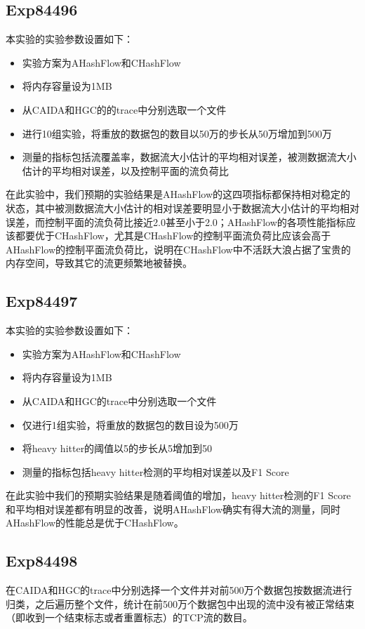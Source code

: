 \documentclass{article}
\begin{document}
\subsection{Exp84496}
本实验的实验参数设置如下：
\begin{itemize}
\item 实验方案为AHashFlow和CHashFlow
\item 将内存容量设为1MB
\item 从CAIDA和HGC的的trace中分别选取一个文件
\item 进行10组实验，将重放的数据包的数目以50万的步长从50万增加到500万
\item 测量的指标包括流覆盖率，数据流大小估计的平均相对误差，被测数据流大小估计的平均相对误差，以及控制平面的流负荷比
\end{itemize}

在此实验中，我们预期的实验结果是AHashFlow的这四项指标都保持相对稳定的状态，其中被测数据流大小估计的相对误差要明显小于数据流大小估计的平均相对误差，而控制平面的流负荷比接近2.0甚至小于2.0；AHashFlow的各项性能指标应该都要优于CHashFlow，尤其是CHashFlow的控制平面流负荷比应该会高于AHashFlow的控制平面流负荷比，说明在CHashFlow中不活跃大浪占据了宝贵的内存空间，导致其它的流更频繁地被替换。

\subsection{Exp84497}
本实验的实验参数设置如下：
\begin{itemize}
\item 实验方案为AHashFlow和CHashFlow
\item 将内存容量设为1MB
\item 从CAIDA和HGC的trace中分别选取一个文件
\item 仅进行1组实验，将重放的数据包的数目设为500万
\item 将heavy hitter的阈值以5的步长从5增加到50
\item 测量的指标包括heavy hitter检测的平均相对误差以及F1 Score
\end{itemize}

在此实验中我们的预期实验结果是随着阈值的增加，heavy hitter检测的F1 Score和平均相对误差都有明显的改善，说明AHashFlow确实有得大流的测量，同时AHashFlow的性能总是优于CHashFlow。

\subsection{Exp84498}
在CAIDA和HGC的trace中分别选择一个文件并对前500万个数据包按数据流进行归类，之后遍历整个文件，统计在前500万个数据包中出现的流中没有被正常结束（即收到一个结束标志或者重置标志）的TCP流的数目。
\end{document}
